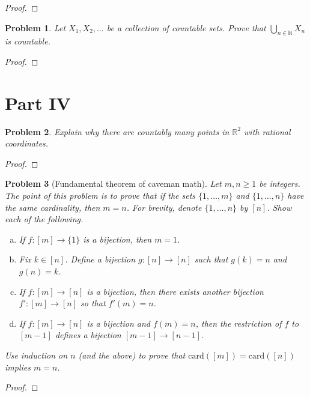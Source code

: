 \documentclass[11pt]{article}
\newtheorem{problem}{Problem}
\theoremstyle{definition}
\theoremstyle{case}
\begin{document}
\begin{proof}
\end{proof}

\begin{problem}
Let $X_1,X_2,\ldots$ be a collection of countable sets. Prove that $\bigcup_{n\in\mathbb N}X_n$ is countable.
\end{problem}

\begin{proof}

\end{proof}





\section{Part IV}

\begin{problem}
Explain why there are countably many points in $\mathbb R^2$ with rational coordinates. 
\end{problem}

\begin{proof}

\end{proof}

\begin{problem}[Fundamental theorem of caveman math] Let $m,n\ge1$ be integers. The point of this problem is to prove that if the sets $\{1,\ldots,m\}$ and $\{1,\ldots,n\}$ have the same cardinality, then $m=n$. For brevity, denote $\{1,\ldots,n\}$ by $[n]$. Show each of the following.
\begin{enumerate}[(a)]
\item If $f:[m]\rightarrow \{1\}$ is a bijection, then $m=1$. 
\item Fix $k\in[n]$. Define a bijection $g:[n]\rightarrow[n]$ such that $g(k)=n$ and $g(n)=k$. 
\item If $f:[m]\rightarrow[n]$ is a bijection, then there exists another bijection $f':[m]\rightarrow [n]$ so that $f'(m)=n$. 
\item If $f:[m]\rightarrow[n]$ is a bijection and $f(m)=n$, then the restriction of $f$ to $[m-1]$ defines a bijection $[m-1]\rightarrow[n-1]$. 
\end{enumerate} 
Use induction on $n$ (and the above) to prove that $\text{card}([m])=\text{card}([n])$ implies $m=n$. 
\end{problem}

\begin{proof}
\end{proof}
\end{document}
